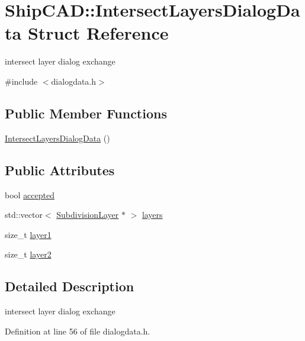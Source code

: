 \hypertarget{structShipCAD_1_1IntersectLayersDialogData}{}\section{Ship\+C\+AD\+:\+:Intersect\+Layers\+Dialog\+Data Struct Reference}
\label{structShipCAD_1_1IntersectLayersDialogData}


intersect layer dialog exchange  




{\ttfamily \#include $<$dialogdata.\+h$>$}

\subsection*{Public Member Functions}
\begin{DoxyCompactItemize}
\item 
\hyperlink{structShipCAD_1_1IntersectLayersDialogData_a0409b79676069fc5f8e7024c6558b400}{Intersect\+Layers\+Dialog\+Data} ()
\end{DoxyCompactItemize}
\subsection*{Public Attributes}
\begin{DoxyCompactItemize}
\item 
bool \hyperlink{structShipCAD_1_1IntersectLayersDialogData_a7e7e7ce1ce0b9f4febc9fa82b1c9a2f8}{accepted}
\item 
std\+::vector$<$ \hyperlink{classShipCAD_1_1SubdivisionLayer}{Subdivision\+Layer} $\ast$ $>$ \hyperlink{structShipCAD_1_1IntersectLayersDialogData_a4eaea862a9ce61c04b6a1d0b972ca9c1}{layers}
\item 
size\+\_\+t \hyperlink{structShipCAD_1_1IntersectLayersDialogData_a2a06240ead3bc2d61dbc5bb3eb21ea99}{layer1}
\item 
size\+\_\+t \hyperlink{structShipCAD_1_1IntersectLayersDialogData_ad138f2eea90f7bac0a9c331375b1704a}{layer2}
\end{DoxyCompactItemize}


\subsection{Detailed Description}
intersect layer dialog exchange 

Definition at line 56 of file dialogdata.\+h.




